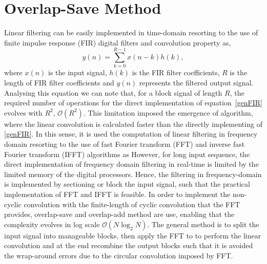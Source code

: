 %
%
\clearpage
\section{Overlap-Save Method}
Linear filtering can be easily implemented in time-domain resorting to the use of finite impulse response (FIR) digital filters and convolution property as,
\begin{equation}
    y(n)= \sum\limits_{k=0}^{R-1} x(n-k)h\left(k\right),
    \label{genFIR}
\end{equation}
where $x(n)$ is the input signal, $h(k)$ is the FIR filter coefficients, $R$ is the length of FIR filter coefficients and $y(n)$ represents the filtered output signal.
Analysing this equation we can note that, for a block signal of length $R$, the required number of operations for the direct implementation of equation~\eqref{genFIR} evolves with $R^2$, $\mathcal{O}(R^2)$. This limitation imposed the emergence of algorithm, where the linear convolution is calculated faster than the directly implementing of \eqref{genFIR}.
In this sense, it is used the computation of linear filtering in frequency domain resorting to the use of fast Fourier transform (FFT) and inverse fast Fourier transform (IFFT) algorithms as
However, for long input sequence, the direct implementation of frequency domain filtering in real-time is limited by the limited memory of the digital processors.
Hence, the filtering in frequency-domain is implemented by sectioning or block the input signal, such that the practical implementation  of FFT and IFFT is feasible. In order to implement the non-cyclic convolution with the finite-length of cyclic convolution that the FFT provides, overlap-save and overlap-add method are use, enabling that the complexity evolves in log scale $\mathcal{O}(N\log_2N)$. The general method is to split the input signal into manageable blocks, then apply the FFT to to perform the linear convolution and at the end recombine the output blocks such that it is avoided the wrap-around errors due to the circular convolution imposed by FFT.

